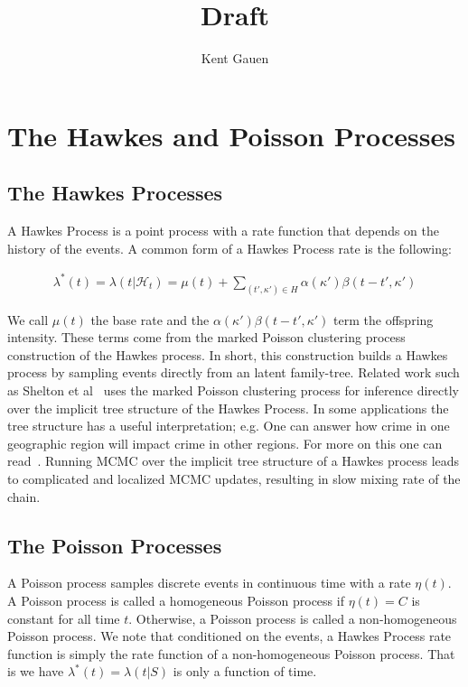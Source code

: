 \documentclass[11pt]{article}
\author{Kent Gauen}
\title{Draft}
\begin{document}
\maketitle

\section{The Hawkes and Poisson Processes}

\subsection{The Hawkes Processes}

\noindent A Hawkes Process is a point process with a rate function that depends on the history of the events. A common form of a Hawkes Process rate is the following:

\begin{align}
  \lambda^*(t)
  =
  \lambda(t|\mathcal{H}_t)
  =
  \mu(t)
  +
  \sum_{(t',\kappa')\in H}\alpha(\kappa')\beta(t-t',\kappa')
\end{align}

\noindent We call $\mu(t)$ the base rate and the $\alpha(\kappa')\beta(t-t',\kappa')$ term the offspring intensity. These terms come from the marked Poisson clustering process construction of the Hawkes process. In short, this construction builds a Hawkes process by sampling events directly from an latent family-tree. Related work such as Shelton et al~\cite{AAAI1816985} uses the marked Poisson clustering process for inference directly over the implicit tree structure of the Hawkes Process. In some applications the tree structure has a useful interpretation; e.g. One can answer how crime in one geographic region will impact crime in other regions. For more on this one can read~\cite{Rasmussen2013}. Running MCMC over the implicit tree structure of a Hawkes process leads to complicated and localized MCMC updates, resulting in slow mixing rate of the chain.

\subsection{The Poisson Processes}

\noindent A Poisson process samples discrete events in continuous time with a rate $\eta(t)$. A Poisson process is called a homogeneous Poisson process if $\eta(t) = C$ is constant for all time $t$. Otherwise, a Poisson process is called a non-homogeneous Poisson process. We note that conditioned on the events, a Hawkes Process rate function is simply the rate function of a non-homogeneous Poisson process. That is we have $\lambda^*(t) = \lambda(t | S)$ is only a function of time.
\end{document}
